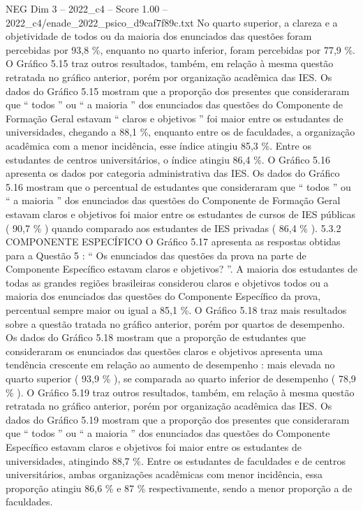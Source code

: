 \begin{textsample}{NEG Dim 3 – 2022\_c4 – Score 1.00 – 2022\_c4/enade\_2022\_psico\_d9caf7f89c.txt}
No quarto superior, a clareza e a objetividade de todos ou da maioria dos enunciados das questões foram percebidas por 93,8 \%, enquanto no quarto inferior, foram percebidas por 77,9 \%.
O Gráfico 5.15 traz outros resultados, também, em relação à mesma questão retratada no gráfico anterior, porém por organização acadêmica das IES.
Os dados do Gráfico 5.15 mostram que a proporção dos presentes que consideraram que “ todos ” ou “ a maioria ” dos enunciados das questões do Componente de Formação Geral estavam “ claros e objetivos ” foi maior entre os estudantes de universidades, chegando a 88,1 \%, enquanto entre os de faculdades, a organização acadêmica com a menor incidência, esse índice atingiu 85,3 \%.
Entre os estudantes de centros universitários, o índice atingiu 86,4 \%.
O Gráfico 5.16 apresenta os dados por categoria administrativa das IES.
Os dados do Gráfico 5.16 mostram que o percentual de estudantes que consideraram que “ todos ” ou “ a maioria ” dos enunciados das questões do Componente de Formação Geral estavam claros e objetivos foi maior entre os estudantes de cursos de IES públicas ( 90,7 \% ) quando comparado aos estudantes de IES privadas ( 86,4 \% ). 5.3.2 COMPONENTE ESPECÍFICO O Gráfico 5.17 apresenta as respostas obtidas para a Questão 5 : “ Os enunciados das questões da prova na parte de Componente Específico estavam claros e objetivos? ”.
A maioria dos estudantes de todas as grandes regiões brasileiras considerou claros e objetivos todos ou a maioria dos enunciados das questões do Componente Específico da prova, percentual sempre maior ou igual a 85,1 \%.
O Gráfico 5.18 traz mais resultados sobre a questão tratada no gráfico anterior, porém por quartos de desempenho.
Os dados do Gráfico 5.18 mostram que a proporção de estudantes que consideraram os enunciados das questões claros e objetivos apresenta uma tendência crescente em relação ao aumento de desempenho : mais elevada no quarto superior ( 93,9 \% ), se comparada ao quarto inferior de desempenho ( 78,9 \% ).
O Gráfico 5.19 traz outros resultados, também, em relação à mesma questão retratada no gráfico anterior, porém por organização acadêmica das IES.
Os dados do Gráfico 5.19 mostram que a proporção dos presentes que consideraram que “ todos ” ou “ a maioria ” dos enunciados das questões do Componente Específico estavam claros e objetivos foi maior entre os estudantes de universidades, atingindo 88,7 \%.
Entre os estudantes de faculdades e de centros universitários, ambas organizações acadêmicas com menor incidência, essa proporção atingiu 86,6 \% e 87 \% respectivamente, sendo a menor proporção a de faculdades.

\end{textsample}
